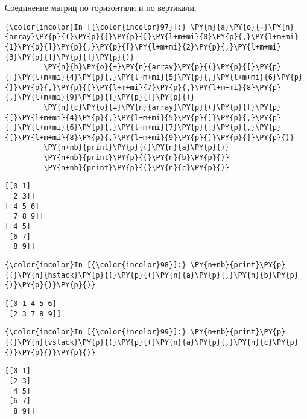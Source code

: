     Соединение матриц по горизонтали и по вертикали.

    \begin{Verbatim}[commandchars=\\\{\}]
{\color{incolor}In [{\color{incolor}97}]:} \PY{n}{a}\PY{o}{=}\PY{n}{array}\PY{p}{(}\PY{p}{[}\PY{p}{[}\PY{l+m+mi}{0}\PY{p}{,}\PY{l+m+mi}{1}\PY{p}{]}\PY{p}{,}\PY{p}{[}\PY{l+m+mi}{2}\PY{p}{,}\PY{l+m+mi}{3}\PY{p}{]}\PY{p}{]}\PY{p}{)}
         \PY{n}{b}\PY{o}{=}\PY{n}{array}\PY{p}{(}\PY{p}{[}\PY{p}{[}\PY{l+m+mi}{4}\PY{p}{,}\PY{l+m+mi}{5}\PY{p}{,}\PY{l+m+mi}{6}\PY{p}{]}\PY{p}{,}\PY{p}{[}\PY{l+m+mi}{7}\PY{p}{,}\PY{l+m+mi}{8}\PY{p}{,}\PY{l+m+mi}{9}\PY{p}{]}\PY{p}{]}\PY{p}{)}
         \PY{n}{c}\PY{o}{=}\PY{n}{array}\PY{p}{(}\PY{p}{[}\PY{p}{[}\PY{l+m+mi}{4}\PY{p}{,}\PY{l+m+mi}{5}\PY{p}{]}\PY{p}{,}\PY{p}{[}\PY{l+m+mi}{6}\PY{p}{,}\PY{l+m+mi}{7}\PY{p}{]}\PY{p}{,}\PY{p}{[}\PY{l+m+mi}{8}\PY{p}{,}\PY{l+m+mi}{9}\PY{p}{]}\PY{p}{]}\PY{p}{)}
         \PY{n+nb}{print}\PY{p}{(}\PY{n}{a}\PY{p}{)}
         \PY{n+nb}{print}\PY{p}{(}\PY{n}{b}\PY{p}{)}
         \PY{n+nb}{print}\PY{p}{(}\PY{n}{c}\PY{p}{)}
\end{Verbatim}

    \begin{Verbatim}[commandchars=\\\{\}]
[[0 1]
 [2 3]]
[[4 5 6]
 [7 8 9]]
[[4 5]
 [6 7]
 [8 9]]

    \end{Verbatim}

    \begin{Verbatim}[commandchars=\\\{\}]
{\color{incolor}In [{\color{incolor}98}]:} \PY{n+nb}{print}\PY{p}{(}\PY{n}{hstack}\PY{p}{(}\PY{p}{(}\PY{n}{a}\PY{p}{,}\PY{n}{b}\PY{p}{)}\PY{p}{)}\PY{p}{)}
\end{Verbatim}

    \begin{Verbatim}[commandchars=\\\{\}]
[[0 1 4 5 6]
 [2 3 7 8 9]]

    \end{Verbatim}

    \begin{Verbatim}[commandchars=\\\{\}]
{\color{incolor}In [{\color{incolor}99}]:} \PY{n+nb}{print}\PY{p}{(}\PY{n}{vstack}\PY{p}{(}\PY{p}{(}\PY{n}{a}\PY{p}{,}\PY{n}{c}\PY{p}{)}\PY{p}{)}\PY{p}{)}
\end{Verbatim}

    \begin{Verbatim}[commandchars=\\\{\}]
[[0 1]
 [2 3]
 [4 5]
 [6 7]
 [8 9]]

    \end{Verbatim}

